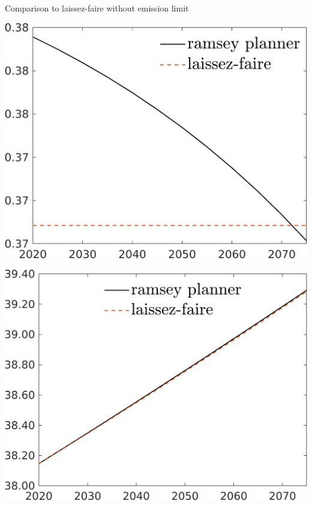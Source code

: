 \documentclass[11pt,aspectratio=169]{beamer}
\begin{document}
\begin{frame}{Comparison to laissez-faire without emission limit}
\begin{minipage}[]{0.32\textwidth}
	\includegraphics[width=1\textwidth]{../codding_model/own_basedOnFried/optimalPol_elastS_DisuSci/figures/all_1705/hh_LFCompOPT_NOT_NoTaus_spillover0_noskill1_sep1_BN0_ineq0_red0_xgrowth0_etaa0.79_lgd1.png}
\end{minipage}
\begin{minipage}[]{0.32\textwidth}
	\includegraphics[width=1\textwidth]{../codding_model/own_basedOnFried/optimalPol_elastS_DisuSci/figures/all_1705/A_LFCompOPT_NOT_NoTaus_spillover0_noskill1_sep1_BN0_ineq0_red0_xgrowth0_etaa0.79_lgd1.png}

\end{minipage}
\end{frame}
\end{document}
